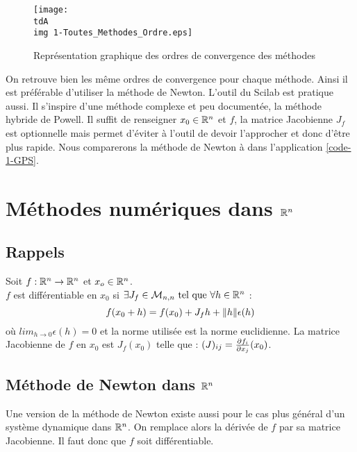 		\begin{figure}[H]
			\centering
			\texttt{[image: \\tdA\\img 1-Toutes\_Methodes\_Ordre.eps]}
			\caption{Représentation graphique des ordres de convergence des méthodes}
			\label{img-1-ordre}
		\end{figure}

		On retrouve bien les même ordres de convergence pour chaque méthode.
		Ainsi il est préférable d'utiliser la méthode de Newton. L'outil  du Scilab est pratique aussi. Il s'inspire d'une méthode complexe et peu documentée, la méthode hybride de Powell. Il suffit de renseigner $x_0 \in \mathbb{R}^n$ et $f$, la matrice Jacobienne $J_f$ est optionnelle mais permet d'éviter à l'outil de devoir l'approcher et donc d'être plus rapide. Nous comparerons la méthode de Newton à  dans l'application \eqref{code-1-GPS}.

\section{Méthodes numériques dans \texorpdfstring{$\mathbb{R}^n$}{Rn}}

	\subsection{Rappels}
		\begin{definition}[Différentiabilité]
			Soit $f: \mathbb{R}^n \to \mathbb{R}^n$ et $x_o \in \mathbb{R}^n$.
			\\$f$ est différentiable en $x_0$ si $\exists J_f \in \mathcal{M}_{n,n} \text{ tel que } \forall h \in \mathbb{R}^n$ :
			$$
				f(x_0 +h) = f(x_0) + J_f h + \lVert h \rVert \epsilon(h)
			$$
			où $lim_{h \to 0} \epsilon(h) = 0$ et la norme utilisée est la norme euclidienne.
			La matrice Jacobienne de $f$ en $x_0$ est $J_f(x_0)$ telle que : $(J)_{ij} = \frac{\partial f_i}{\partial x_j}(x_0)$.
		\end{definition}

	\subsection{Méthode de Newton dans \texorpdfstring{$\mathbb{R}^n$}{Rn}}

		Une version de la méthode de Newton existe aussi pour le cas plus général d'un système dynamique dans $\mathbb{R}^n$. On remplace alors la dérivée de $f$ par sa matrice Jacobienne. Il faut donc que $f$ soit différentiable.


